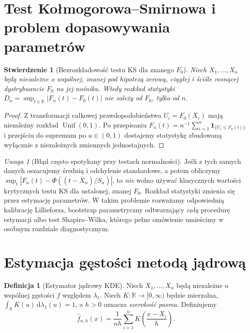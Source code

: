 \documentclass[11pt,a4paper,oneside]{report}
\numberwithin{equation}{chapter}
\theoremstyle{plain}
\newtheorem{stwierdzenie}[twierdzenie]{Stwierdzenie}
\theoremstyle{definition}
\newtheorem{definicja}{Definicja}[chapter]
\theoremstyle{remark}
\newtheorem{uwaga}{Uwaga}[chapter]
\newcommand{\R}{\mathbb R}
\newcommand{\ind}[1]{\mathbf 1_{#1}}
\newcommand{\dd}{\mathrm d}
\begin{document}
\section{Test Kołmogorowa--Smirnowa i problem dopasowywania parametrów}
\begin{stwierdzenie}[Bezrozkładowość testu KS dla znanego $F_0$]
\label{prop:ks-distributionfree}
Niech $X_1,\ldots,X_n$ będą niezależne o wspólnej,
\emph{znanej pod hipotezą zerową}, ciągłej i ściśle
rosnącej dystrybuancie $F_0$ na jej nośniku.
Wtedy rozkład statystyki
$D_n=\sup_{t\in\R}|F_n(t)-F_0(t)|$
nie zależy od $F_0$, tylko od $n$.
\end{stwierdzenie}
\begin{proof}
Z transformacji całkowej prawdopodobieństwa
$U_i=F_0(X_i)$ mają niezależny rozkład
$\operatorname{Unif}(0,1)$. Po przepisaniu
$F_n(t)=n^{-1}\sum_{i=1}^n\ind{\{U_i\le F_0(t)\}}$
i przejściu do supremum po $u\in(0,1)$
dostajemy statystykę zbudowaną wyłącznie z
niezależnych zmiennych jednostajnych.
\end{proof}

\begin{uwaga}[Błąd często spotykany przy testach normalności]
Jeśli z tych samych danych oszacujemy średnią i
odchylenie standardowe, a potem obliczymy
$\sup_t|F_n(t)-\Phi((t-\overline X_n)/S_n)|$,
to \emph{nie} wolno używać klasycznych wartości
krytycznych testu KS dla ustalonej, znanej $F_0$.
Rozkład statystyki zmienia się przez estymację parametrów.
W takim problemie rozważamy odpowiednią kalibrację
Lillieforsa, bootstrap parametryczny odtwarzający
\emph{całą} procedurę estymacji albo test Shapiro--Wilka,
którego pełne omówienie umieścimy w osobnym
rozdziale diagnostycznym.
\end{uwaga}

\section{Estymacja gęstości metodą jądrową}
\begin{definicja}[Estymator jądrowy KDE]
\label{def:kde}
Niech $X_1,\ldots,X_n$ będą niezależne o wspólnej
gęstości $f$ względem $\lambda_1$. Niech
$K\colon\R\to[0,\infty)$ będzie mierzalna,
$\int_\R K(u)\,\dd\lambda_1(u)=1$,
a $h>0$ oznacza \emph{szerokość pasma}.
Definiujemy
\[
 \widehat f_{n,h}(x)=\frac1{nh}
 \sum_{i=1}^nK\left(\frac{x-X_i}{h}\right).
\]
\end{definicja}
\end{document}
